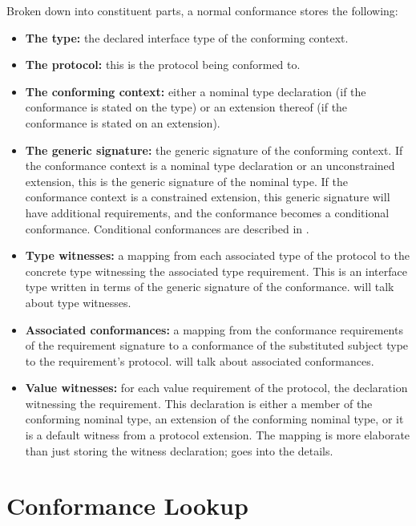\documentclass[../generics]{subfiles}
\begin{document}
Broken down into constituent parts, a normal conformance stores the following:
\begin{itemize}
\item \textbf{The type:} the declared interface type of the conforming context.
\item \textbf{The protocol:} this is the protocol being conformed to.
\item \textbf{The conforming context:} either a nominal type declaration (if the conformance is stated on the type) or an extension thereof (if the conformance is stated on an extension).
\item \textbf{The generic signature:} the generic signature of the conforming context. If the conformance context is a nominal type declaration or an unconstrained extension, this is the generic signature of the nominal type. If the conformance context is a constrained extension, this generic signature will have additional requirements, and the conformance becomes a conditional conformance. Conditional conformances are described in .
\item \textbf{Type witnesses:} a mapping from each associated type of the protocol to the concrete type witnessing the associated type requirement. This is an interface type written in terms of the generic signature of the conformance.  will talk about type witnesses.
\item \textbf{Associated conformances:} a mapping from the conformance requirements of the requirement signature to a conformance of the substituted subject type to the requirement's protocol.  will talk about associated conformances.
\item \textbf{Value witnesses:} for each value requirement of the protocol, the declaration witnessing the requirement. This declaration is either a member of the conforming nominal type, an extension of the conforming nominal type, or it is a default witness from a protocol extension. The mapping is more elaborate than just storing the witness declaration;  goes into the details.
\end{itemize}

\section{Conformance Lookup}\label{conformance lookup}
\end{document}
